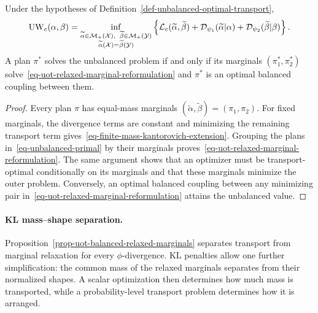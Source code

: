 \begin{prop}\label{prop-uot-balanced-relaxed-marginals}
	Under the hypotheses of Definition~\ref{def-unbalanced-optimal-transport},
	\begin{equation}\label{eq-uot-relaxed-marginal-reformulation}
		\UW_c(\alpha,\beta)
		=
		\inf_{\substack{\widetilde\alpha\in\Mm_+(\Xx),\ \,\widetilde\beta\in\Mm_+(\Yy)\\
			\widetilde\alpha(\Xx)=\widetilde\beta(\Yy)}}
		\left\{
			\MK_c(\widetilde\alpha,\widetilde\beta)
			+\Dd_{\psi_1}(\widetilde\alpha|\alpha)
			+\Dd_{\psi_2}(\widetilde\beta|\beta)
		\right\}.
	\end{equation}
	A plan $\pi^*$ solves the unbalanced problem if and only if its marginals $(\pi_1^*,\pi_2^*)$ solve~\eqref{eq-uot-relaxed-marginal-reformulation} and $\pi^*$ is an optimal balanced coupling between them.
\end{prop}

\begin{proof}
	Every plan $\pi$ has equal-mass marginals $(\widetilde\alpha,\widetilde\beta)=(\pi_1,\pi_2)$. For fixed marginals, the divergence terms are constant and minimizing the remaining transport term gives~\eqref{eq-finite-mass-kantorovich-extension}. Grouping the plans in~\eqref{eq-unbalanced-primal} by their marginals proves~\eqref{eq-uot-relaxed-marginal-reformulation}. The same argument shows that an optimizer must be transport-optimal conditionally on its marginals and that these marginals minimize the outer problem. Conversely, an optimal balanced coupling between any minimizing pair in~\eqref{eq-uot-relaxed-marginal-reformulation} attains the unbalanced value.
\end{proof}

\paragraph{KL mass--shape separation.}

Proposition~\ref{prop-uot-balanced-relaxed-marginals} separates transport from marginal relaxation for every $\phi$-divergence. KL penalties allow one further simplification: the common mass of the relaxed marginals separates from their normalized shapes. A scalar optimization then determines how much mass is transported, while a probability-level transport problem determines how it is arranged.

